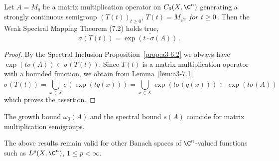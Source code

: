 \begin{theorem}\label{thm:a3-7.2}
Let $A = M_{q}$ be a matrix multiplication operator on $C_{0}(X,\C^{n})$ generating a strongly continuous semigroup $(T(t))_{t\geq 0}$,   $T(t) = M_{\mathrm{e}^{tq}} \textit{ for } t \geq 0$\,.
Then the Weak Spectral Mapping Theorem (7.2) holds true, \ie 
\[
\sigma(T(t)) = \overline{\exp(t\cdot\sigma(A))}\,.
\]

\end{theorem}
\begin{proof}
By the Spectral Inclusion Proposition~\ref{prop:a3-6.2} we always have $\exp(t\sigma(A)) \subset \sigma(T(t))$.
Since $T(t)$ is a matrix multiplication operator with a bounded function, we obtain from Lemma~\ref{lem:a3-7.1}
\[
\sigma(T(t)) = \overline{\bigcup_{x\in X} \sigma(\exp(tq(x)))} = \overline{\bigcup_{x\in X} \exp(t\sigma(q(x)))} \subset \overline{\exp(t\sigma(A))}
\]
which proves the assertion.
\end{proof}
\begin{corollary}\label{cor:a3-7.3}
The growth bound $\omega_{0}(A)$ and the spectral bound $s(A)$ coincide for matrix multiplication semigroups.
\end{corollary}
The above results remain valid for other Banach spaces of $\C^{n}$-valued functions such as $L^{p}(X,\C^{n})$, $1 \leq p < \infty$.

